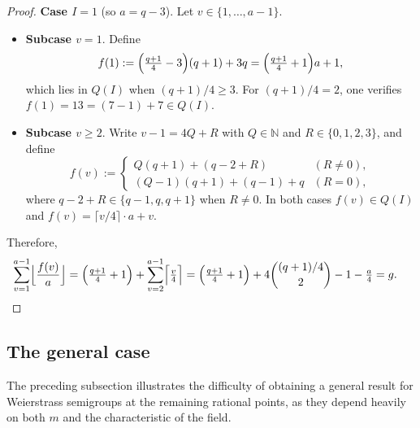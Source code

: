 \documentclass[12pt]{amsart}
\theoremstyle{remark}
\theoremstyle{definition}
\newcommand{\coloneqq}{\mathrel{:=}}
\begin{document}
\begin{proof}
    \medskip
    \noindent\textbf{Case $I = 1$} (so $a = q-3$). 
    Let $v \in \{1, \ldots, a-1\}$.

    \begin{itemize}
        \item \textbf{Subcase $v = 1$}. Define
        \[
            f(1) \coloneqq \Bigl(\tfrac{q+1}{4} - 3\Bigr)(q+1) + 3q 
            = \Bigl(\tfrac{q+1}{4} + 1\Bigr)a + 1,
        \]
        which lies in $Q(I)$ when $(q+1)/4 \ge 3$. For $(q+1)/4 = 2$, 
        one verifies $f(1) = 13 = (7-1) + 7 \in Q(I)$.

        \item \textbf{Subcase $v \ge 2$}. Write $v - 1 = 4Q + R$ with 
        $Q \in \mathbb{N}$ and $R \in \{0,1,2,3\}$, and define
        \[
            f(v) \coloneqq
            \begin{cases}
                Q(q+1) + (q - 2 + R) & (R \neq 0), \\
                (Q-1)(q+1) + (q-1) + q & (R = 0),
            \end{cases}
        \]
        where $q - 2 + R \in \{q-1, q, q+1\}$ when $R \neq 0$. 
        In both cases $f(v) \in Q(I)$ and $f(v) = \lceil v/4 \rceil \cdot a + v$.
    \end{itemize}

    Therefore,
    \begin{align*}
        \sum_{v=1}^{a-1} \Bigl\lfloor \frac{f(v)}{a} \Bigr\rfloor
        &= \Bigl(\tfrac{q+1}{4} + 1\Bigr) 
        + \sum_{v=2}^{a-1} \Bigl\lceil \tfrac{v}{4} \Bigr\rceil 
        = \Bigl(\tfrac{q+1}{4} + 1\Bigr) 
        + 4\binom{(q+1)/4}{2} - 1 - \tfrac{a}{4} = g. \qedhere
    \end{align*}
\end{proof}

\subsection{The general case}

The preceding subsection illustrates the difficulty of obtaining a general 
result for Weierstrass semigroups at the remaining rational points, as they 
depend heavily on both $m$ and the characteristic of the field.
\end{document}
